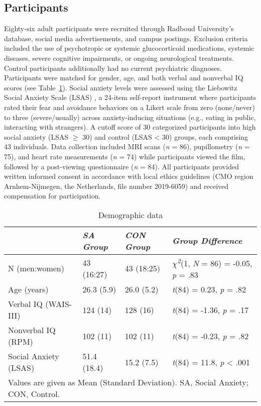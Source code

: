 \subsection{Participants}
Eighty-six adult participants were recruited through Radboud University's database, social media advertisements, and campus postings. Exclusion criteria included the use of psychotropic or systemic glucocorticoid medications, systemic diseases, severe cognitive impairments, or ongoing neurological treatments. Control participants additionally had no current psychiatric diagnoses. Participants were matched for gender, age, and both verbal and nonverbal IQ scores \citep{raven1989,wechsler1997} (see Table~\ref{tab:ppt-stats-sa}). Social anxiety levels were assessed using the Liebowitz Social Anxiety Scale (LSAS) \citep{liebowitz1987,oakman2003}, a 24-item self-report instrument where participants rated their fear and avoidance behaviors on a Likert scale from zero (none/never) to three (severe/usually) across anxiety-inducing situations (e.g., eating in public, interacting with strangers). A cutoff score of 30 \citep{rytwinski2009} categorized participants into high social anxiety (LSAS $\geq$ 30) and control (LSAS < 30) groups, each comprising 43 individuals. Data collection included MRI scans (\textit{n} = 86), pupillometry (\textit{n} = 75), and heart rate measurements (\textit{n} = 74) while participants viewed the film, followed by a post-viewing questionnaire (\textit{n} = 84). All participants provided written informed consent in accordance with local ethics guidelines (CMO region Arnhem-Nijmegen, the Netherlands, file number 2019-6059) and received compensation for participation.

\begin{table}[ht]
    \captionsetup{justification=raggedright, singlelinecheck=false, font = normal} %
    \setlength{\tabcolsep}{7pt} %
    \renewcommand{\arraystretch}{1.5} %
    \caption{Demographic data}
    \label{tab:ppt-stats-sa}
    \begin{tabular}{llll}
    \hline
    \textbf{} & \textit{SA Group} & \textit{CON Group} & \textit{Group Difference} \\
    \hline
    N (men:women) & 43 (16:27) & 43 (18:25) & \textit{$\chi$\textsuperscript{2}}(1, \textit{N} = 86) = -0.05, \textit{p} = .83 \\
    Age (years) & 26.3 (5.9) & 26.0 (5.2) & \textit{t}(84) = 0.23, \textit{p} = .82 \\
    Verbal IQ (WAIS-III) & 124 (14) & 128 (16) & \textit{t}(84) = -1.36, \textit{p} = .17 \\
    Nonverbal IQ (RPM) & 102 (11) & 102 (11) & \textit{t}(84) = -0.23, \textit{p} = .82 \\
    Social Anxiety (LSAS) & 51.4 (18.4) & 15.2 (7.5) & \textit{t}(84) = 11.8, \textit{p} < .001 \\
    \hline
    \multicolumn{4}{l}{\footnotesize{Values are given as Mean (Standard Deviation). SA, Social Anxiety; CON, Control.}} \\
    \end{tabular}
\end{table}

